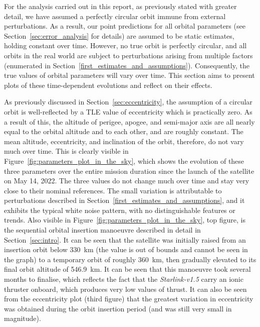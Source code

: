 \documentclass{article}
\begin{document}
For the analysis carried out in this report, as previously stated with greater detail, we have assumed a perfectly circular orbit immune from external perturbations. As a result, our point predictions for all orbital parameters (see Section~\ref{sec:error_analysis} for details) are assumed to be static estimates, holding constant over time. However, no true orbit is perfectly circular, and all orbits in the real world are subject to perturbations arising from multiple factors (enumerated in Section~\ref{first_estimates_and_assumptions}). Consequently, the true values of orbital parameters will vary over time. This section aims to present plots of these time-dependent evolutions and reflect on their effects.

As previously discussed in Section~\ref{sec:eccentricity}, the assumption of a circular orbit is well-reflected by a TLE value of eccentricity which is practically zero. As a result of this, the altitude of perigee, apogee, and semi-major axis are all nearly equal to the orbital altitude and to each other, and are roughly constant. The mean altitude, eccentricity, and inclination of the orbit, therefore, do not vary much over time. This is clearly visible in Figure~\ref{fig:parameters_plot_in_the_sky}, which shows the evolution of these three parameters over the entire mission duration since the launch of the satellite on May 14, 2022. The three values do not change much over time and stay very close to their nominal references. The small variation is attributable to perturbations described in Section~\ref{first_estimates_and_assumptions}, and it exhibits the typical white noise pattern, with no distinguishable features or trends. Also visible in Figure~\ref{fig:parameters_plot_in_the_sky}, top figure, is the sequential orbital insertion manoeuvre described in detail in Section~\ref{sec:intro}. It can be seen that the satellite was initially raised from an insertion orbit below \SI{330}{\kilo\metre} (the value is out of bounds and cannot be seen in the graph) to a temporary orbit of roughly \SI{360}{\kilo\metre}, then gradually elevated to its final orbit altitude of \SI{546.9}{\kilo\metre}. It can be seen that this manoeuvre took several months to finalise, which reflects the fact that the \textit{Starlink-v1.5} carry an ionic thruster onboard, which produces very low values of thrust. It can also be seen from the eccentricity plot (third figure) that the greatest variation in eccentricity was obtained during the orbit insertion period (and was still very small in magnitude).
\end{document}
